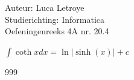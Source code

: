 \documentclass[a4paper]{article}
\begin{document}
  
\noindent \large Auteur: Luca Letroye \\
\noindent \large Studierichting: Informatica\\
\noindent \large Oefeningenreeks 4A nr. 20.4\\

\medskip


\normalsize

$\displaystyle\int \coth x dx = \ln|\sinh(x)| +c$

\begin{thebibliography}{999}
\end{thebibliography}
\end{document}

